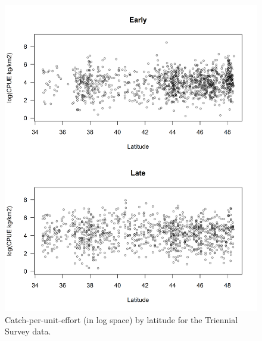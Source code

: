 \documentclass[12pt,]{article}
\begin{document}
\begin{figure}
\centering
\includegraphics{Figures/Tri_CPUE_Lat.png}
\caption{Catch-per-unit-effort (in log space) by latitude for the
Triennial Survey data. \label{fig:tri_cpue_lat}}
\end{figure}

\FloatBarrier
\end{document}
